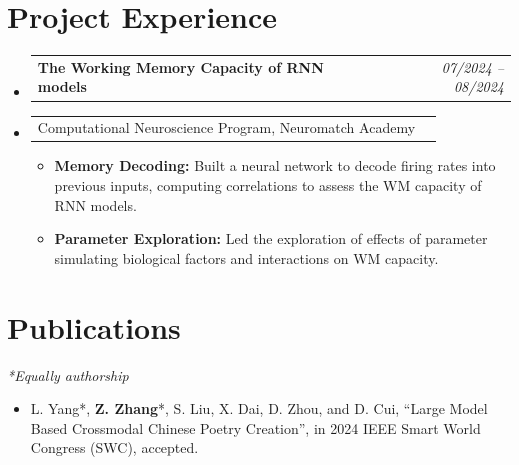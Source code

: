 \documentclass[letterpaper,11pt]{article}
\makeatletter
\newcommand{\resumeItem}[1]{
  \item{
    {\normalsize#1 \vspace{-2pt}}
  }
}
\newcommand{\resumeProjectHeading}[2]{
    \item
    \begin{tabular*}{0.97\textwidth}{l@{\extracolsep{\fill}}r}
       #1 & \textit{#2} \\
    \end{tabular*}\vspace{-7pt}
}
\newcommand{\resumeSubHeadingListStart}{\vspace{0pt}\begin{itemize}[leftmargin=0.15in, label={}]}
\newcommand{\resumeSubHeadingListEnd}{\end{itemize}}
\newcommand{\resumeItemListStart}{\begin{itemize}}
\newcommand{\resumeItemListEnd}{\end{itemize}\vspace{-7pt}}
\makeatother
\begin{document}
\section{Project Experience}
    \resumeSubHeadingListStart

        \resumeProjectHeading
        {\textbf{The Working Memory Capacity of RNN models}}{07/2024 -- 08/2024}
        \resumeProjectHeading
        {Computational Neuroscience Program, Neuromatch Academy}{}
        \resumeItemListStart
            \resumeItem{\textbf{Memory Decoding:} Built a neural network to decode firing rates into previous inputs, computing correlations to assess the WM capacity of RNN models.}
            \resumeItem{\textbf{Parameter Exploration:} Led the exploration of effects of parameter simulating biological factors and interactions on WM capacity.}
        \resumeItemListEnd
		
        
    \resumeSubHeadingListEnd

\section{Publications}
    \hspace{10pt}\textit{*Equally authorship} 
    \vspace{-5pt}
    \begin{itemize}[leftmargin=0.15in, label={}]
        \item L. Yang*, \textbf{Z. Zhang}*, S. Liu, X. Dai, D. Zhou, and D. Cui, “Large Model Based Crossmodal Chinese Poetry Creation”, in 2024 IEEE Smart World Congress (SWC), accepted.
    \end{itemize}
    \vspace{-13pt}
    
\end{document}
